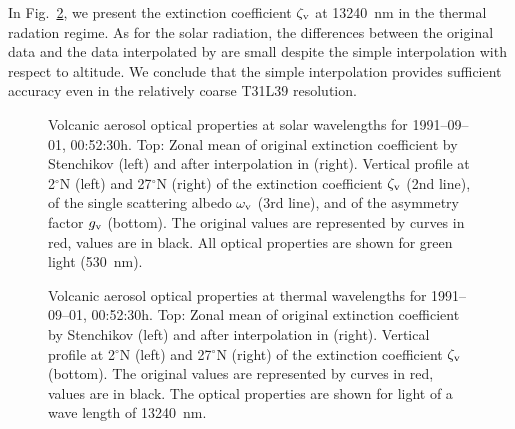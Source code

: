 \begin{appendix}
In Fig.~\ref{fig_aop2}, we present the extinction coefficient
$\zeta_{\rm v}$ at 13240~nm in the thermal radation regime. As for the
solar radiation, the differences between the original data and the
data interpolated by \echam{} are small despite the simple interpolation
with respect to altitude.
We conclude that the simple interpolation
provides sufficient accuracy even in the relatively coarse T31L39
\echam{} resolution.

\begin{figure}
\vspace{-4cm}
\pcteight
{\vspace{-1.7cm}}
{\vspace{-1.7cm}}
{\vspace{-1.7cm}\rule{0cm}{3.2cm}}
{\vspace{-1.7cm}}
{\vspace{-1.7cm}\rule{0cm}{3.2cm}}
{\vspace{-1.7cm}}
{\rule{0cm}{3.2cm}}
{}
\caption{Volcanic aerosol optical properties at solar wavelengths for
  1991--09--01, 00:52:30h. 
  Top: Zonal mean of original extinction coefficient by
  Stenchikov (left) and after 
  interpolation in \echam{} (right). Vertical profile at 2$^\circ$N (left) and
  27$^\circ$N (right) of the extinction coefficient $\zeta_{\rm v}$ (2nd
  line), of the single scattering albedo $\omega_{\rm v}$ (3rd line), and of the
  asymmetry factor $g_{\rm v}$ (bottom). The original values are represented by
  curves in red, \echam{} values are in black. All optical properties
  are shown for green light (530~nm).}\label{fig_aop1}  
\end{figure}

\begin{figure}
\vspace{-4cm}
\pctfour
{\vspace{-1.7cm}}
{\vspace{-1.7cm}}
{\rule{0cm}{3.5cm}}
{}
\caption{Volcanic aerosol optical properties at thermal wavelengths
  for 1991--09--01, 00:52:30h.  
  Top: Zonal mean of original extinction coefficient by Stenchikov
  (left) and after interpolation in \echam{} (right). Vertical profile
  at 2$^\circ$N (left) and 
  27$^\circ$N (right) of the extinction coefficient $\zeta_{\rm
    v}$ (bottom). The original values are represented by
  curves in red, \echam{} values are in black. The optical properties
  are shown for light of a wave length of 13240~nm.}\label{fig_aop2}  
\end{figure}


\end{appendix}
